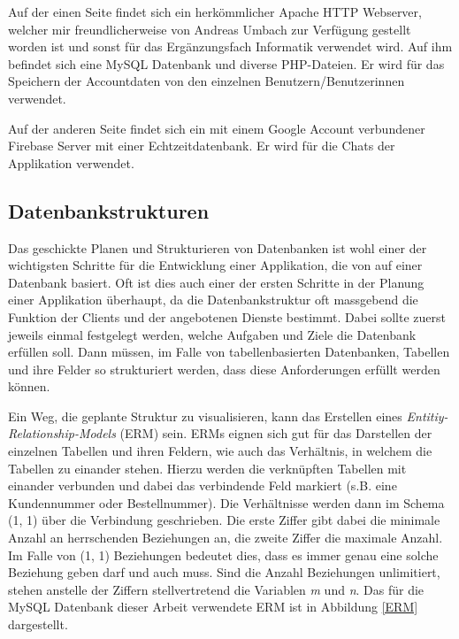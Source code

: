\documentclass[../main.tex]{subfiles}
\begin{document}
	Auf der einen Seite findet sich ein herkömmlicher Apache HTTP Webserver, welcher mir freundlicherweise von Andreas Umbach zur Verfügung gestellt worden ist und sonst für das Ergänzungsfach Informatik verwendet wird. Auf ihm befindet sich eine MySQL Datenbank und diverse PHP-Dateien. Er wird für das Speichern der Accountdaten von den einzelnen Benutzern/Benutzerinnen verwendet.
	
	Auf der anderen Seite findet sich ein mit einem Google Account verbundener Firebase Server mit einer Echtzeitdatenbank. Er wird für die Chats der Applikation verwendet.
	
	\subsection{Datenbankstrukturen}
	Das geschickte Planen und Strukturieren von Datenbanken ist wohl einer der wichtigsten Schritte für die Entwicklung einer Applikation, die von auf einer Datenbank basiert. Oft ist dies auch einer der ersten Schritte in der Planung einer Applikation überhaupt, da die Datenbankstruktur oft massgebend die Funktion der Clients und der angebotenen Dienste bestimmt. Dabei sollte zuerst jeweils einmal festgelegt werden, welche Aufgaben und Ziele die Datenbank erfüllen soll. Dann müssen, im Falle von tabellenbasierten Datenbanken, Tabellen und ihre Felder so strukturiert werden, dass diese Anforderungen erfüllt werden können. 
	
	Ein Weg, die geplante Struktur zu visualisieren, kann das Erstellen eines \emph{Entitiy-Relationship-Models} (ERM) sein. ERMs eignen sich gut für das Darstellen der einzelnen Tabellen und ihren Feldern, wie auch das Verhältnis, in welchem die Tabellen zu einander stehen. Hierzu werden die verknüpften Tabellen mit einander verbunden und dabei das verbindende Feld markiert (s.B. eine Kundennummer oder Bestellnummer). Die Verhältnisse werden dann im Schema (1, 1) über die Verbindung geschrieben. Die erste Ziffer gibt dabei die minimale Anzahl an herrschenden Beziehungen an, die zweite Ziffer die maximale Anzahl. Im Falle von (1, 1) Beziehungen bedeutet dies, dass es immer genau eine solche Beziehung geben darf und auch muss. Sind die Anzahl Beziehungen unlimitiert, stehen anstelle der Ziffern stellvertretend die Variablen \emph{m} und \emph{n}. Das für die MySQL Datenbank dieser Arbeit verwendete ERM ist in Abbildung \ref{ERM} dargestellt.
	
\end{document}
